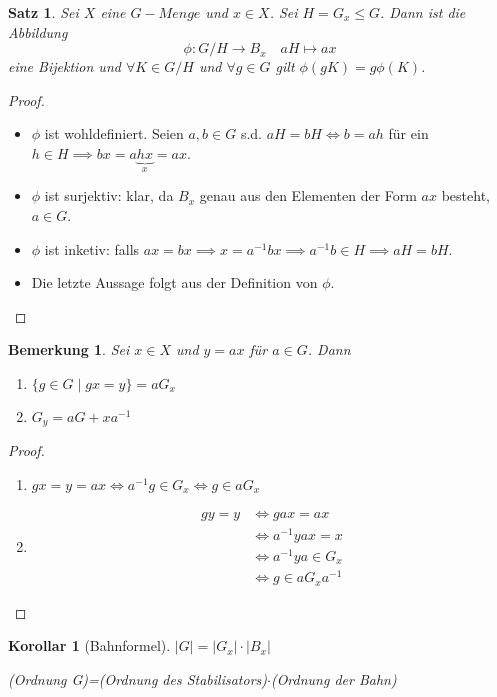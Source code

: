 \documentclass{article}
\theoremstyle{plain}
\newtheorem{theorem}{Satz}
\newtheorem{corollary}{Korollar}
\newtheorem{bemerkung}{Bemerkung}
\newcommand{\ug}{\leq}
\begin{document}
\begin{theorem}\label{stz:bahn}
    Sei $X$ eine $G-Menge$ und $x\in X$. Sei $H=G_x \ug G$. Dann ist die Abbildung
    $$\phi\colon G/H \to B_x \quad aH\mapsto ax$$
    eine Bijektion und $\forall K\in G/H$ und $\forall g\in G$ gilt $\phi(gK)=g\phi(K)$.
\end{theorem}
\begin{proof}
    \begin{itemize}
        \item $\phi$ ist wohldefiniert. Seien $a,b\in G$ s.d. $aH=bH\Leftrightarrow b=ah$ für ein $h\in H \implies bx=a\underbrace{hx}_x =ax$.
        \item $\phi$ ist surjektiv: klar, da $B_x$ genau aus den Elementen der Form $ax$ besteht, $a\in G$.
        \item $\phi$ ist inketiv: falls $ax=bx \implies x=a^{-1}bx\implies a^{-1}b\in H\implies aH=bH$. 
        \item Die letzte Aussage folgt aus der Definition von $\phi$.
    \end{itemize}
\end{proof}
\begin{bemerkung}
    Sei $x\in X$ und $y=ax$ für $a\in G$. Dann
    \begin{enumerate}[label=(\alph*)]
        \item $\{g\in G\mid gx=y\}=aG_x$
        \item $G_y=aG+xa^{-1}$
    \end{enumerate}
\end{bemerkung}
\begin{proof}
    \begin{enumerate}[label=(\alph*)]
        \item $gx=y=ax \Leftrightarrow a^{-1}g\in G_x\Leftrightarrow g\in aG_x$
        \item \begin{align*}
            gy=y&\Leftrightarrow gax=ax\\
            &\Leftrightarrow a^{-1}yax=x\\
            &\Leftrightarrow a^{-1}ya\in G_x\\
            &\Leftrightarrow g\in aG_xa^{-1}
        \end{align*}
    \end{enumerate}
\end{proof}
\begin{corollary}[Bahnformel]
    $|G|=|G_x|\cdot|B_x|$

    (Ordnung G)=(Ordnung des Stabilisators)$\cdot$(Ordnung der Bahn)
\end{corollary}
\end{document}
